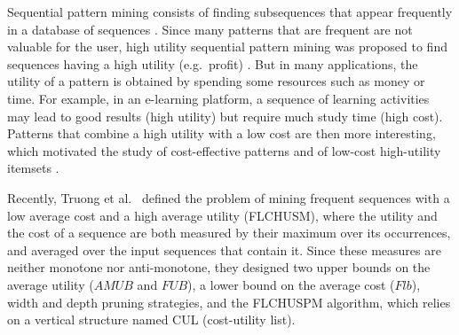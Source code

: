 \documentclass[pdflatex,sn-mathphys,Numbered]{sn-jnl}
\theoremstyle{thmstyleone}
\theoremstyle{thmstyletwo}
\theoremstyle{thmstylethree}
\newcommand{\FL}{\textsc{FLCHUSPM}}
\newcommand{\amub}{\ensuremath{\mathit{AMUB}}}
\newcommand{\fub}{\ensuremath{\mathit{FUB}}}
\newcommand{\flb}{\ensuremath{\mathit{Flb}}}
\begin{document}
Sequential pattern mining consists of finding subsequences that appear frequently in a database
of sequences \cite{agrawal1995}. Since many patterns that are frequent are not valuable for the
user, high utility sequential pattern mining was proposed to find sequences having a high
utility (e.g.\ profit) \cite{yin2012uspan,gan2021survey}. But in many applications, the utility of a
pattern is obtained by spending some resources such as money or time. For example, in an
e-learning platform, a sequence of learning activities may lead to good results (high utility)
but require much study time (high cost). Patterns that combine a high utility with a low cost
are then more interesting, which motivated the study of cost-effective patterns
\cite{fournier2020cost} and of low-cost high-utility itemsets \cite{nawaz2022lcim}.

Recently, Truong et al.\ \cite{truong2022} defined the problem of mining frequent sequences
with a low average cost and a high average utility (FLCHUSM), where the utility and the cost of a
sequence are both measured by their maximum over its occurrences, and averaged over the input
sequences that contain it. Since these measures are neither monotone nor anti-monotone, they
designed two upper bounds on the average utility (\amub{} and \fub), a lower bound on the
average cost (\flb), width and depth pruning strategies, and the \FL{} algorithm, which relies
on a vertical structure named CUL (cost-utility list).
\end{document}
